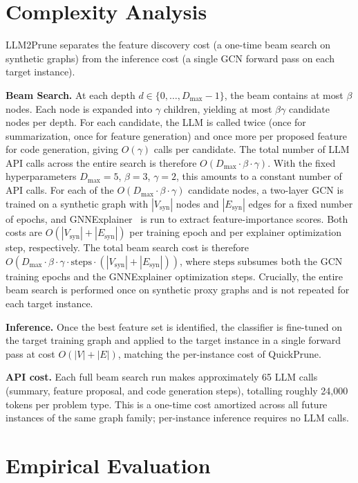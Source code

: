 \section{Complexity Analysis}

LLM2Prune separates the feature discovery cost (a one-time beam search on synthetic
graphs) from the inference cost (a single GCN forward pass on each target instance).

\textbf{Beam Search.} At each depth $d \in \{0, \ldots, D_{\max}-1\}$, the beam
contains at most $\beta$ nodes. Each node is expanded into $\gamma$ children, yielding
at most $\beta\gamma$ candidate nodes per depth. For each candidate, the LLM is called
twice (once for summarization, once for feature generation) and once more per proposed
feature for code generation, giving $O(\gamma)$ calls per candidate. The total number
of LLM API calls across the entire search is therefore $O(D_{\max} \cdot \beta \cdot
\gamma)$. With the fixed hyperparameters $D_{\max} = 5$, $\beta = 3$, $\gamma = 2$,
this amounts to a constant number of API calls. For each of the $O(D_{\max} \cdot \beta
\cdot \gamma)$ candidate nodes, a two-layer GCN is trained on a synthetic graph with
$|V_{\text{syn}}|$ nodes and $|E_{\text{syn}}|$ edges for a fixed number of epochs, and
GNNExplainer~\citep{ying2019gnnexplainer} is run to extract feature-importance scores.
Both costs are $O(|V_{\text{syn}}| + |E_{\text{syn}}|)$ per training epoch and per
explainer optimization step, respectively. The total beam search cost is therefore
$O(D_{\max} \cdot \beta \cdot \gamma \cdot \text{steps} \cdot
(|V_{\text{syn}}| + |E_{\text{syn}}|))$,
where $\text{steps}$ subsumes both the GCN training epochs and the GNNExplainer
optimization steps. Crucially, the entire beam search is performed once on synthetic
proxy graphs and is not repeated for each target instance.

\textbf{Inference.} Once the best feature set is identified, the classifier is
fine-tuned on the target training graph and applied to the target instance in a single
forward pass at cost $O(|V| + |E|)$, matching the per-instance cost of QuickPrune.

\textbf{API cost.} Each full beam search run makes approximately 65 LLM calls (summary,
feature proposal, and code generation steps), totalling roughly 24,000 tokens per problem
type. This is a one-time cost amortized across all future instances of the same graph
family; per-instance inference requires no LLM calls.

\section{Empirical Evaluation}

